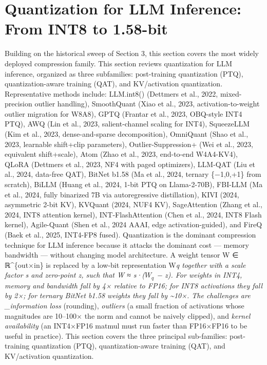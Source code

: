 \documentclass{article}
\begin{document}
\section{Quantization for LLM Inference: From INT8 to 1.58-bit}\label{quantization-for-llm-inference-from-int8-to-1.58-bit}

Building on the historical sweep of Section 3, this section covers the most widely deployed compression family. This section reviews quantization for LLM inference, organized as three subfamilies: post-training quantization (PTQ), quantization-aware training (QAT), and KV/activation quantization. Representative methods include: LLM.int8() (Dettmers et al., 2022, mixed-precision outlier handling), SmoothQuant (Xiao et al., 2023, activation-to-weight outlier migration for W8A8), GPTQ (Frantar et al., 2023, OBQ-style INT4 PTQ), AWQ (Lin et al., 2023, salient-channel scaling for INT4), SqueezeLLM (Kim et al., 2023, dense-and-sparse decomposition), OmniQuant (Shao et al., 2023, learnable shift+clip parameters), Outlier-Suppression+ (Wei et al., 2023, equivalent shift+scale), Atom (Zhao et al., 2023, end-to-end W4A4-KV4), QLoRA (Dettmers et al., 2023, NF4 with paged optimizers), LLM-QAT (Liu et al., 2024, data-free QAT), BitNet b1.58 (Ma et al., 2024, ternary \{−1,0,+1\} from scratch), BiLLM (Huang et al., 2024, 1-bit PTQ on Llama-2-70B), FBI-LLM (Ma et al., 2024, fully binarized 7B via autoregressive distillation), KIVI (2024, asymmetric 2-bit KV), KVQuant (2024, NUF4 KV), SageAttention (Zhang et al., 2024, INT8 attention kernel), INT-FlashAttention (Chen et al., 2024, INT8 Flash kernel), Agile-Quant (Shen et al., 2024 AAAI, edge activation-guided), and FireQ (Baek et al., 2025, INT4-FP8 fused). Quantization is the dominant compression technique for LLM inference because it attacks the dominant cost --- memory bandwidth --- without changing model architecture. A weight tensor W ∈ ℝ\^{}\{out×in\} is replaced by a low-bit representation W\emph{q together with a scale factor s and zero-point z, such that W ≈ s·(\(W_q\) − z). For weights in INT4, memory and bandwidth fall by 4× relative to FP16; for INT8 activations they fall by 2×; for ternary BitNet b1.58 weights they fall by \textasciitilde10×. The challenges are \_information loss} (rounding), \emph{outliers} (a small fraction of activations whose magnitudes are 10--100× the norm and cannot be naively clipped), and \emph{kernel availability} (an INT4×FP16 matmul must run faster than FP16×FP16 to be useful in practice). This section covers the three principal sub-families: post-training quantization (PTQ), quantization-aware training (QAT), and KV/activation quantization.
\end{document}
